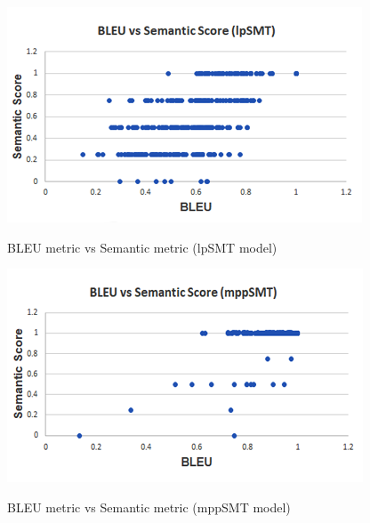 \begin{figure}
\caption{BLEU metric vs Semantic metric (lpSMT model)}
\centering
\includegraphics{img/bleuvssemantic_lpSMT.png}
\label{fig:BleuSemlpSMT}
\end{figure}

\begin{figure}
\caption{BLEU metric vs Semantic metric (mppSMT model)}
\centering
\includegraphics{img/bleuvssemantic_mppSMT.png}
\label{fig:BleuSemMppSMT}
\end{figure}

